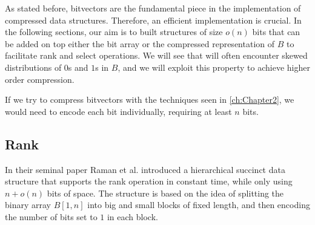 \begin{example}

\end{example}
 \vspace{0.4cm}

\noindent As stated before, bitvectors are the fundamental piece in the implementation of compressed data structures. Therefore, an efficient implementation is crucial. In the following sections, our aim is to built structures of size $o(n)$ bits that can be added on top either the bit array or the compressed representation of $B$ to facilitate rank and select operations. We will see that will often encounter skewed distributions of $0$s and $1$s in $B$, and we will exploit this property to achieve higher order compression.

\begin{remark}
    If we try to compress bitvectors with the techniques seen in \autoref{ch:Chapter2}, we would need to encode each bit individually, requiring at least $n$ bits.
\end{remark}

\subsection{Rank} \label{subsec:rank}

In their seminal paper \cite{RRR2002} Raman et al. introduced a hierarchical succinct data structure that supports the rank operation in constant time, while only using  $n + o(n)$  bits of space. The structure is based on the idea of splitting the binary array $B[1, n]$ into big and small blocks of fixed length, and then encoding the number of bits set to $1$ in each block. \vspace{0.4cm}


